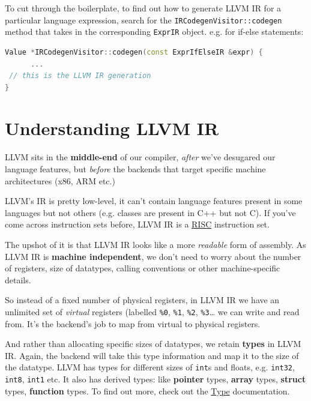 To cut through the boilerplate, to find out how to generate LLVM IR for
a particular language expression, search for the
\texttt{IRCodegenVisitor::codegen} method that takes in the
corresponding \texttt{ExprIR} object. e.g. for if-else statements:


\begin{lstlisting}[language=C++]
Value *IRCodegenVisitor::codegen(const ExprIfElseIR &expr) {
      ...
 // this is the LLVM IR generation
}
\end{lstlisting}

\hypertarget{understanding-llvm-ir}{%
\section{\texorpdfstring{\protect\hyperlink{understanding-llvm-ir}{}Understanding
LLVM IR}{Understanding LLVM IR}}\label{understanding-llvm-ir}}

LLVM sits in the \textbf{middle-end} of our compiler, \emph{after} we've
desugared our language features, but \emph{before} the backends that
target specific machine architectures (x86, ARM etc.)

LLVM's IR is pretty low-level, it can't contain language features
present in some languages but not others (e.g. classes are present in
C++ but not C). If you've come across instruction sets before, LLVM IR
is a
\href{https://en.wikipedia.org/wiki/Reduced_instruction_set_computer\#:~:text=A\%20reduced\%20instruction\%20set\%20computer,instruction\%20set\%20computer\%20(CISC).}{RISC}
instruction set.

The upshot of it is that LLVM IR looks like a more \emph{readable} form
of assembly. As LLVM IR is \textbf{machine independent}, we don't need
to worry about the number of registers, size of datatypes, calling
conventions or other machine-specific details.

So instead of a fixed number of physical registers, in LLVM IR we have
an unlimited set of \emph{virtual} registers (labelled \texttt{\%0},
\texttt{\%1}, \texttt{\%2}, \texttt{\%3}\ldots{} we can write and read
from. It's the backend's job to map from virtual to physical registers.

And rather than allocating specific sizes of datatypes, we retain
\textbf{types} in LLVM IR. Again, the backend will take this type
information and map it to the size of the datatype. LLVM has types for
different sizes of \texttt{int}s and floats, e.g. \texttt{int32},
\texttt{int8}, \texttt{int1} etc. It also has derived types: like
\textbf{pointer} types, \textbf{array} types, \textbf{struct} types,
\textbf{function} types. To find out more, check out the
\href{https://llvm.org/doxygen/classllvm_1_1Type.html}{Type}
documentation.

